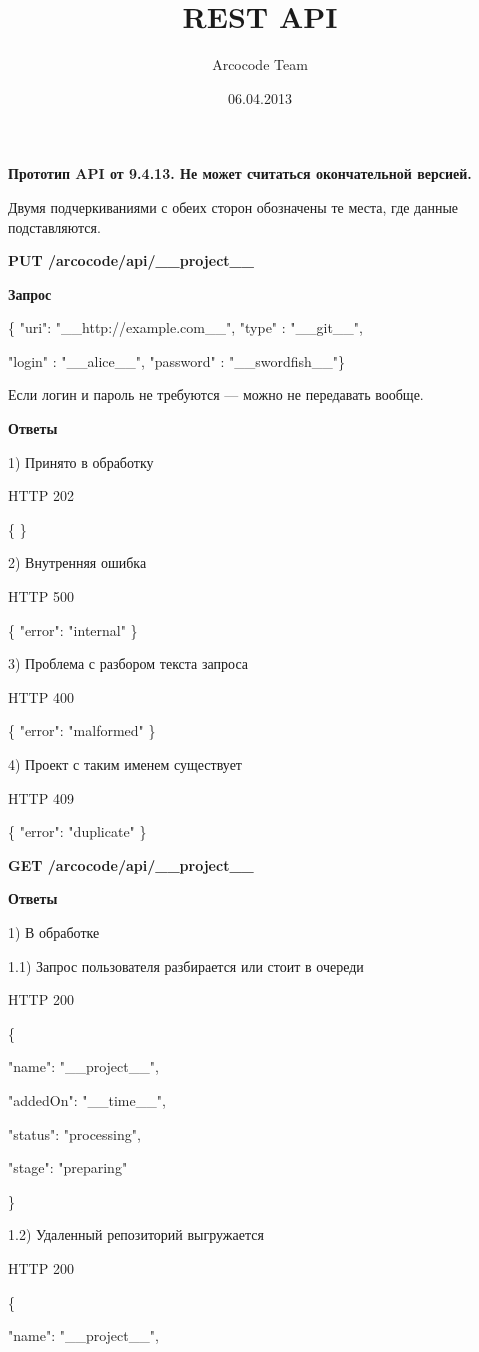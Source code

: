 \documentclass[a4paper,12pt]{article}
\title{REST API}
\date{06.04.2013}
\author{Arcocode Team}
\begin{document}
\maketitle
\newpage
\textbf{Прототип API от 9.4.13. Не может считаться окончательной версией.}

Двумя подчеркиваниями с обеих сторон обозначены те места, где данные подставляются.

\textbf{PUT /arcocode/api/\_\_project\_\_}

\textbf{Запрос}

\{ "uri": "\_\_http://example.com\_\_", "type" : "\_\_git\_\_", 

"login" : "\_\_alice\_\_", "password" : "\_\_swordfish\_\_"\}

Если логин и пароль не требуются — можно не передавать вообще.

\textbf{Ответы}

1) Принято в обработку

HTTP 202

\{  \}

2) Внутренняя ошибка

HTTP 500

\{ "error": "internal" \}

3) Проблема с разбором текста запроса

HTTP 400

\{ "error": "malformed" \}

4) Проект с таким именем существует

HTTP 409

\{ "error": "duplicate" \}

\newpage
\textbf{GET /arcocode/api/\_\_project\_\_}

\textbf{Ответы}

1) В обработке

1.1) Запрос пользователя разбирается или стоит в очереди

HTTP 200

\{

  "name": "\_\_project\_\_",

  "addedOn": "\_\_time\_\_",

  "status": "processing",

  "stage": "preparing"

\}

1.2) Удаленный репозиторий выгружается

HTTP 200

\{

  "name": "\_\_project\_\_",
\end{document}
